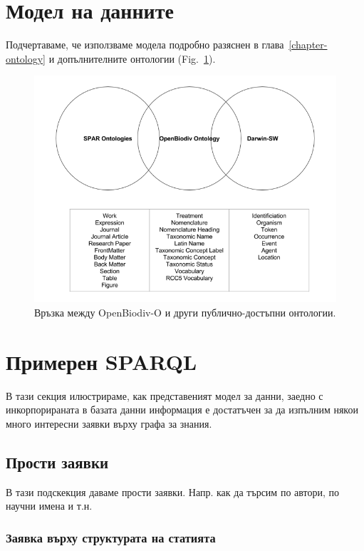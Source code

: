 \section{Модел на данните}

Подчертаваме, че използваме модела подробно разяснен в глава~\ref{chapter-ontology} и допълнителните онтологии (Fig.~\ref{fig:community-ontologies}).

\begin{figure}
\centering
\includegraphics[width=\textwidth]{Figures/community-ontologies}
\decoRule
\caption[Overlap of OpenBiodiv-O with Community Ontologies]{Връзка между OpenBiodiv-O и други публично-достъпни онтологии.}
\label{fig:community-ontologies}
\end{figure}

\section{Примерен SPARQL}

В тази секция илюстрираме, как представеният модел за данни, заедно с инкорпорираната в базата данни информация е достатъчен за да изпълним някои много интересни заявки върху графа за знания.

\subsection{Прости заявки}

В тази подскекция даваме прости заявки. Напр. как да търсим по автори, по научни имена и т.н.

\subsubsection{Заявка върху структурата на статията} 

